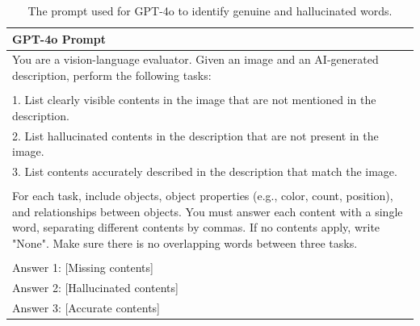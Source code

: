 \documentclass{article}
\theoremstyle{plain}
\theoremstyle{definition}
\theoremstyle{remark}
\begin{document}
\begin{table}[ht]
\footnotesize
\centering
\begin{tabular}{p{160mm}}
    \toprule
    GPT-4o Prompt
    \\
    \midrule
    You are a vision-language evaluator. Given an image and an AI-generated description, perform the following tasks:\\
    \\
    1. List clearly visible contents in the image that are not mentioned in the description.\\
    2. List hallucinated contents in the description that are not present in the image.\\
    3. List contents accurately described in the description that match the image.\\
    \\
    For each task, include objects, object properties (e.g., color, count, position), and relationships between objects. You must answer each content with a single word, separating different contents by commas. If no contents apply, write "None". Make sure there is no overlapping words between three tasks.\\
    \\
    
    Answer 1: [Missing contents]\\
    Answer 2: [Hallucinated contents]\\
    Answer 3: [Accurate contents]\\
    \bottomrule
\end{tabular}
\caption{The prompt used for GPT-4o to identify genuine and hallucinated words.}
\label{tab:gpt4o_prompt}
\end{table}

\end{document}
